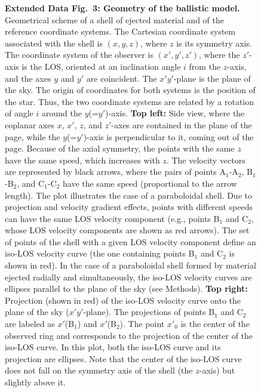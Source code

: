 \documentclass[12pt]{mythesis}
\begin{document}
\begin{figure}[p!]
{\bf Extended Data Fig.\ 3: Geometry of the ballistic model.} Geometrical scheme of a shell of ejected material and of the reference coordinate systems. The Cartesian coordinate system associated with the shell is $(x,y,z)$, where $z$ is its symmetry axis. The coordinate system of the observer is $(x',y',z')$, where the $z'$-axis is the LOS, oriented at an inclination angle $i$ from the $z$-axis, and the axes $y$ and $y'$ are coincident. The $x'y'$-plane is the plane of the sky. The origin of coordinates for both systems is the position of the star. Thus, the two coordinate systems are related by a rotation of angle $i$ around the $y$(=$y'$)-axis. 
{\bf Top left:} Side view, where the coplanar axes $x$, $x'$, $z$, and $z'$-axes are contained in the plane of the page, while the $y$(=$y'$)-axis is perpendicular to it, coming out of the page. Because of the axial symmetry, the points with the same $z$ have the same speed, which increases with $z$. The velocity vectors are represented by black arrows, where the pairs of points A$_1$-A$_2$, B$_1$-B$_2$, and C$_1$-C$_2$ have the same speed (proportional to the arrow length). The plot illustrates the case of a paraboloidal shell. Due to projection and velocity gradient effects, points with different speeds can have the same LOS velocity component (e.g., points B$_1$ and C$_2$, whose LOS velocity components are shown as red arrows). The set of points of the shell with a given LOS velocity component define an iso-LOS velocity curve (the one containing points B$_1$ and C$_2$ is shown in red). In the case of a paraboloidal shell formed by material ejected radially and simultaneously, the iso-LOS velocity curves are ellipses parallel to the plane of the sky (see Methods).
 {\bf Top right:} Projection (shown in red) of the iso-LOS velocity curve onto the plane of the sky ($x'y'$-plane). The projections of points B$_1$ and C$_2$ are labeled as $x'$(B$_1$) and $x'$(B$_2$). The point $x'_0$ is the center of the observed ring and corresponds to the projection of the center of the iso-LOS curve. In this plot, both the iso-LOS curve and its projection are ellipses. Note that the center of the iso-LOS curve does not fall on the symmetry axis of the shell (the $z$-axis) but slightly above it.

\end{figure}
\end{document}
